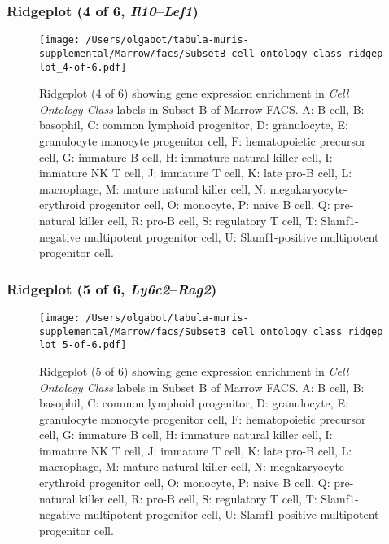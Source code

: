 \subsubsection{Ridgeplot (4 of 6, \emph{Il10}--\emph{Lef1})}
\begin{figure}[h]
\centering
\texttt{[image: /Users/olgabot/tabula-muris-supplemental/Marrow/facs/SubsetB\_cell\_ontology\_class\_ridgeplot\_4-of-6.pdf]}

\caption{ Ridgeplot (4 of 6)  showing gene expression enrichment in \emph{Cell Ontology Class} labels in Subset B of Marrow FACS. A: B cell, B: basophil, C: common lymphoid progenitor, D: granulocyte, E: granulocyte monocyte progenitor cell, F: hematopoietic precursor cell, G: immature B cell, H: immature natural killer cell, I: immature NK T cell, J: immature T cell, K: late pro-B cell, L: macrophage, M: mature natural killer cell, N: megakaryocyte-erythroid progenitor cell, O: monocyte, P: naive B cell, Q: pre-natural killer cell, R: pro-B cell, S: regulatory T cell, T: Slamf1-negative multipotent progenitor cell, U: Slamf1-positive multipotent progenitor cell.}
\end{figure}


\clearpage

\subsubsection{Ridgeplot (5 of 6, \emph{Ly6c2}--\emph{Rag2})}
\begin{figure}[h]
\centering
\texttt{[image: /Users/olgabot/tabula-muris-supplemental/Marrow/facs/SubsetB\_cell\_ontology\_class\_ridgeplot\_5-of-6.pdf]}

\caption{ Ridgeplot (5 of 6)  showing gene expression enrichment in \emph{Cell Ontology Class} labels in Subset B of Marrow FACS. A: B cell, B: basophil, C: common lymphoid progenitor, D: granulocyte, E: granulocyte monocyte progenitor cell, F: hematopoietic precursor cell, G: immature B cell, H: immature natural killer cell, I: immature NK T cell, J: immature T cell, K: late pro-B cell, L: macrophage, M: mature natural killer cell, N: megakaryocyte-erythroid progenitor cell, O: monocyte, P: naive B cell, Q: pre-natural killer cell, R: pro-B cell, S: regulatory T cell, T: Slamf1-negative multipotent progenitor cell, U: Slamf1-positive multipotent progenitor cell.}
\end{figure}


\clearpage

